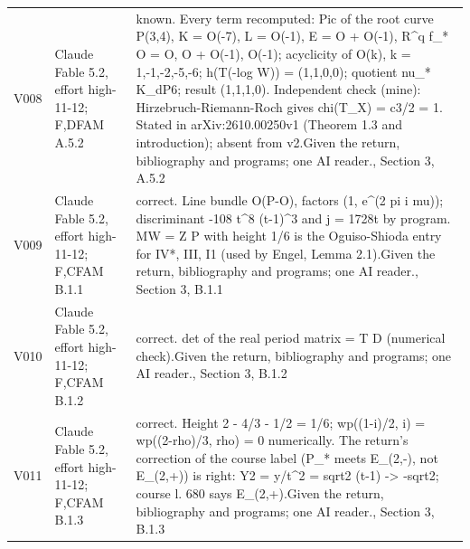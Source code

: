\begin{longtable}{@{}L{.08\linewidth}L{.31\linewidth}L{.56\linewidth}@{}}
V008 & Claude Fable 5.2, effort high-11-12; F,D\newline FAM A.5.2 & known. Every term recomputed:\allowbreak{} Pic of the root curve P(3,4), K = O(-7), L = O(-1), E = O + O(-1), R\textasciicircum{}q f\_\allowbreak{}* O = O, O + O(-1), O(-1); acyclicity of O(k), k = 1,-1,-2,-5,-6; h(T(-log W)) = (1,1,0,0); quotient nu\_\allowbreak{}* K\_\allowbreak{}dP6; result (1,1,1,0). Independent check (mine):\allowbreak{} Hirzebruch-Riemann-Roch gives chi(T\_\allowbreak{}X) = c3/\allowbreak{}2 = 1. Stated in arXiv:\allowbreak{}2610.00250v1 (Theorem 1.3 and introduction); absent from v2.\newline Given the return, bibliography and programs; one AI reader.\newline {}, Section 3, A.5.2\\
V009 & Claude Fable 5.2, effort high-11-12; F,C\newline FAM B.1.1 & correct. Line bundle O(P-O), factors (1, e\textasciicircum{}(2 pi i mu)); discriminant -108 t\textasciicircum{}8 (t-1)\textasciicircum{}3 and j = 1728t by program. MW = Z P with height 1/\allowbreak{}6 is the Oguiso-Shioda entry for IV*, III, I1 (used by Engel, Lemma 2.1).\newline Given the return, bibliography and programs; one AI reader.\newline {}, Section 3, B.1.1\\
V010 & Claude Fable 5.2, effort high-11-12; F,C\newline FAM B.1.2 & correct. det of the real period matrix = T D (numerical check).\newline Given the return, bibliography and programs; one AI reader.\newline {}, Section 3, B.1.2\\
V011 & Claude Fable 5.2, effort high-11-12; F,C\newline FAM B.1.3 & correct. Height 2 - 4/\allowbreak{}3 - 1/\allowbreak{}2 = 1/\allowbreak{}6; wp((1-i)/\allowbreak{}2, i) = wp((2-rho)/\allowbreak{}3, rho) = 0 numerically. The return's correction of the course label (P\_\allowbreak{}* meets E\_\allowbreak{}(2,-), not E\_\allowbreak{}(2,+)) is right:\allowbreak{} Y2 = y/\allowbreak{}t\textasciicircum{}2 = sqrt2 (t-1) -> -sqrt2; course l. 680 says E\_\allowbreak{}(2,+).\newline Given the return, bibliography and programs; one AI reader.\newline {}, Section 3, B.1.3\\

\end{longtable}
